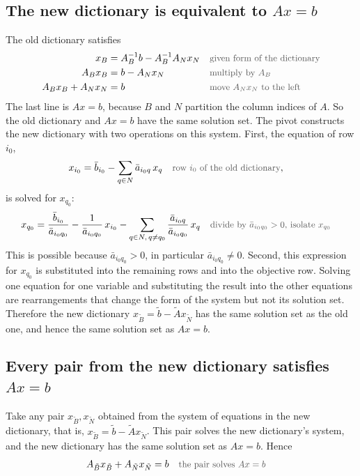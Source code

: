 \documentclass[a4paper,11pt]{article}
\newif\ifexplain
\newcommand{\teil}[1]{\subsection*{#1}}
\newcommand{\why}[1]{\text{\small\color{black!65}#1}}
\newcommand{\explain}[1]{\ifexplain\begin{erklbox}#1\end{erklbox}\fi}
\begin{document}
\teil{The new dictionary is equivalent to $Ax=b$}
The old dictionary satisfies
\begin{align*}
x_B&=A_B^{-1}b-A_B^{-1}A_Nx_N&&\why{given form of the dictionary}\\
A_Bx_B&=b-A_Nx_N&&\why{multiply by $A_B$}\\
A_Bx_B+A_Nx_N&=b&&\why{move $A_Nx_N$ to the left}
\end{align*}
The last line is $Ax=b$, because $B$ and $N$ partition the column indices of $A$. So the old dictionary and $Ax=b$ have the same solution set.
The pivot constructs the new dictionary with two operations on this system. First, the equation of row $i_0$,
\begin{align*}
x_{i_0}&=\bar b_{i_0}-\sum_{q\in N}\bar a_{i_0q}\,x_q&&\why{row $i_0$ of the old dictionary},
\end{align*}
is solved for $x_{q_0}$:
\begin{align*}
x_{q_0}&=\frac{\bar b_{i_0}}{\bar a_{i_0q_0}}-\frac{1}{\bar a_{i_0q_0}}\,x_{i_0}-\sum_{q\in N,\,q\neq q_0}\frac{\bar a_{i_0q}}{\bar a_{i_0q_0}}\,x_q&&\why{divide by $\bar a_{i_0q_0}>0$, isolate $x_{q_0}$}
\end{align*}
This is possible because $\bar a_{i_0q_0}>0$, in particular $\bar a_{i_0q_0}\neq 0$. Second, this expression for $x_{q_0}$ is substituted into the remaining rows and into the objective row. Solving one equation for one variable and substituting the result into the other equations are rearrangements that change the form of the system but not its solution set. Therefore the new dictionary $x_{\tilde B}=\tilde b-\tilde Ax_{\tilde N}$ has the same solution set as the old one, and hence the same solution set as $Ax=b$.
\explain{Warum ist das der springende Punkt? Ein Dictionary ist nur eine umgeformte Version von $Ax=b$: Man multipliziert mit $A_B^{-1}$ und sortiert um. Jeder Pivot ist eine weitere Umformung desselben Gleichungssystems. Umformen ändert die Lösungsmenge nicht. Deshalb beschreiben altes und neues Dictionary exakt dieselben Vektoren $x$.}
\teil{Every pair from the new dictionary satisfies $Ax=b$}
Take any pair $x_{\tilde B},x_{\tilde N}$ obtained from the system of equations in the new dictionary, that is, $x_{\tilde B}=\tilde b-\tilde Ax_{\tilde N}$. This pair solves the new dictionary's system, and the new dictionary has the same solution set as $Ax=b$. Hence
\begin{align*}
A_{\tilde B}x_{\tilde B}+A_{\tilde N}x_{\tilde N}&=b&&\why{the pair solves $Ax=b$}
\end{align*}
\end{document}
